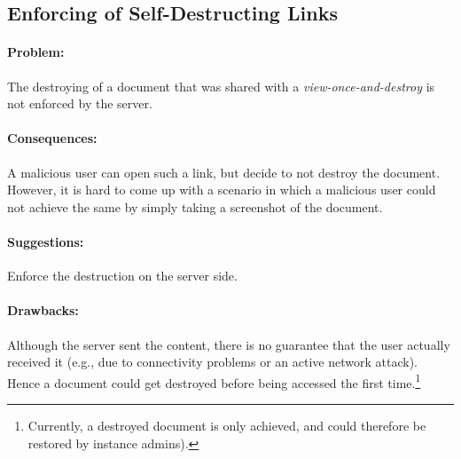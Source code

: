 \subsection{Enforcing of Self-Destructing Links}

\paragraph{Problem:}
The destroying of a document that was shared with a \textit{view-once-and-destroy} is not enforced by the server.

\paragraph{Consequences:}
A malicious user can open such a link, but decide to not destroy the document.
However, it is hard to come up with a scenario in which a malicious user could not achieve the same by simply taking a screenshot of the document.

\paragraph{Suggestions:}
Enforce the destruction on the server side.

\paragraph{Drawbacks:} Although the server sent the content, there is no guarantee that the user actually received it (e.g., due to connectivity problems or an active network attack).
Hence a document could get destroyed before being accessed the first time.\footnote{Currently, a destroyed document is only achieved, and could therefore be restored by instance admins).}
